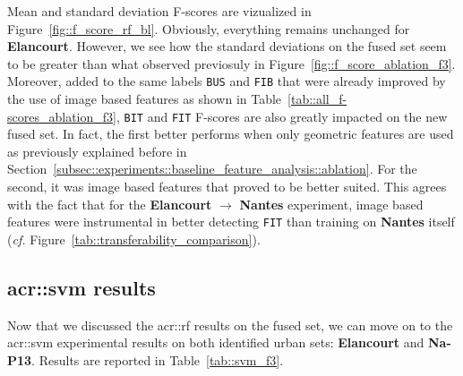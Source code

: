         Mean and standard deviation F-scores are vizualized in Figure~\ref{fig::f_score_rf_bl}.
        Obviously, everything remains unchanged for \textbf{Elancourt}.
        However, we see how the standard deviations on the fused set seem to be greater than what observed previosuly in Figure~\ref{fig::f_score_ablation_f3}.
        Moreover, added to the same labels \texttt{BUS} and \texttt{FIB} that were already improved by the use of image based features as shown in Table~\ref{tab::all_f-scores_ablation_f3}, \texttt{BIT} and \texttt{FIT} F-scores are also greatly impacted on the new fused set.
        In fact, the first better performs when only geometric features are used as previously explained before in Section~\ref{subsec::experiments::baseline_feature_analysis::ablation}.
        For the second, it was image based features that proved to be better suited.
        This agrees with the fact that for the \textbf{Elancourt} \(\rightarrow\) \textbf{Nantes} experiment, image based features were instrumental in better detecting \texttt{FIT} than training on \textbf{Nantes} itself (\textit{cf.} Figure~\ref{tab::transferability_comparison}).
        
    \subsection{\texorpdfstring{\acrshort*{acr::svm}}{SVM} results}
        \label{subsec::more_experiments::classifier::svm}
        Now that we discussed the \gls{acr::rf} results on the fused set, we can move on to the \gls{acr::svm} experimental results on both identified urban sets: \textbf{Elancourt} and \textbf{Na-P13}.
        Results are reported in Table~\ref{tab::svm_f3}.\\

